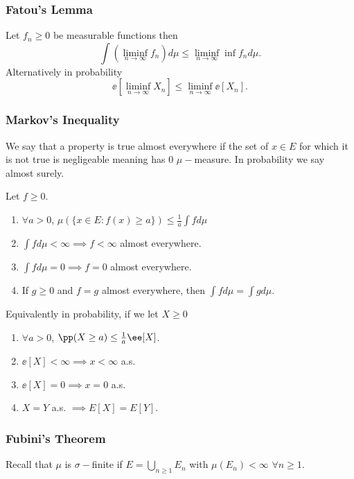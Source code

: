 \documentclass[../main.tex]{subfiles}
\begin{document}
\subsubsection{Fatou's Lemma}

\begin{theorem}
  Let $f_n \geq 0$ be measurable functions then
  \[
    \int (\liminf_{n \to \infty} f_n)d\mu \leq \liminf_{n \to \infty}
    \inf f_n d\mu
  .\] 
  Alternatively in probability
  \[
    \ee[\liminf_{n \to \infty} X_n] \leq \liminf_{n \to \infty}
    \ee[X_n] 
  .\] 
\end{theorem}

\subsubsection{Markov's Inequality}
We say that a property is true almost everywhere if the set of $x \in
E$ for which it is not true is negligeable meaning has $0$
$\mu-$measure. In probability we say almost surely.

\begin{proposition}
    Let $f \geq 0$.

    \begin{enumerate}
      \item $\forall a > 0$, $\mu(\{ x \in E \colon f(x) \geq a \})
        \leq \frac{1}{a} \int fd\mu $
      \item $\int f d\mu < \infty \implies f < \infty$ almost
        everywhere.
      \item $\int f d\mu =0 \implies f = 0$ almost everywhere.
      \item If $g \geq 0$ and $f = g$ almost everywhere, then $\int f
        d\mu = \int g d\mu$.
    \end{enumerate}

    Equivalently in probability, if we let $X \geq 0$

    \begin{enumerate}
      \item $\forall a > 0$, $\pp(X \geq a) \leq \frac{1}{a} \ee[X]$.
      \item $\ee[X] < \infty \implies x < \infty$ a.s.
      \item $\ee[X] = 0 \implies x = 0$ a.s.
      \item $X = Y$ a.s. $\implies E[X] = E[Y]$.
    \end{enumerate}
\end{proposition}

\subsubsection{Fubini's Theorem} Recall that $\mu$ is $\sigma-$finite if $E = \bigcup_{n \geq 1} E_n$ with $\mu(E_n) < \infty$ $\forall n \geq 1$. 
\vspace{0.4em}
\end{document}

